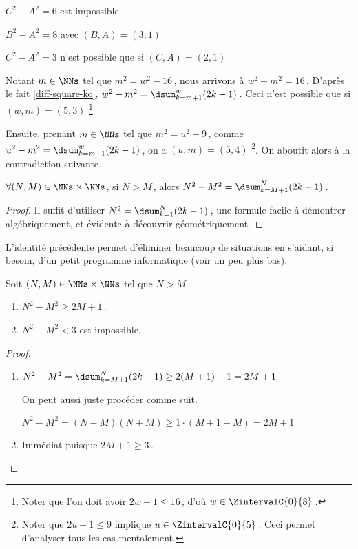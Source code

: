 $C^2 - A^2 = 6$ est impossible.


$B^2 - A^2 = 8$ avec $(B, A) = (3, 1)$


$C^2 - A^2 = 3$    n'est possible que si $(C, A) = (2, 1)$


Notant $m \in \NNs$ tel que $m^2 = w^2 - 16$\,, nous arrivons à $w^2 - m^2 = 16$\,.
		D'après le fait \ref{diff-square-ko}, $w^2 - m^2 = \dsum_{k=m+1}^{w} (2 k - 1)$\,.
		Ceci n'est possible que si $(w, m) = (5, 3)$
		\footnote{
			Noter que l'on doit avoir $2 w - 1 \leq 16$\,, d'où $w \in \ZintervalC{0}{8}$\,.
		}.
		
		
		
Ensuite, prenant $m \in \NNs$ tel que $m^2 = u^2 - 9$\,, comme $u^2 - m^2 = \dsum_{k=m+1}^{w} (2 k - 1)$\,, on a $(u, m) = (5, 4)$
		\footnote{
			Noter que $2 u - 1 \leq 9$ implique $u \in \ZintervalC{0}{5}$\,. Ceci permet d'analyser tous les cas mentalement.
		}.
		On aboutit alors à la contradiction suivante.
		
\begin{fact} \label{dist-square}
	$\forall (N, M) \in \NNs \times \NNs$, 
	si $N > M$\,, alors $N^2 - M^2 = \dsum_{k=M+1}^{N} (2 k - 1)$\,.
\end{fact}


\begin{proof}
	Il suffit d'utiliser $N^2 = \dsum_{k=1}^{N} (2 k - 1)$\,, une formule facile à démontrer algébriquement, et évidente à découvrir géométriquement.
\end{proof}




L'identité précédente permet d'éliminer beaucoup de situations en s'aidant, si besoin, d'un petit programme informatique (voir un peu plus bas).

\begin{fact} \label{diff-square-ko}
	Soit $(N, M) \in \NNs \times \NNs$ tel que $N > M$\,.
	\begin{enumerate}
		\item $N^2 - M^2 \geq 2M + 1$\,.
		
		\item $N^2 - M^2 < 3$ est impossible.
	\end{enumerate}
\end{fact}


\begin{proof}
	\leavevmode
	
	\begin{enumerate}
		\item $N^2 - M^2 = \dsum_{k=M+1}^{N} (2 k - 1) \geq 2(M + 1) - 1 = 2M + 1$
		
		\smallskip
		\noindent
		On peut aussi juste procéder comme suit. 
		
		\smallskip
		\noindent
		$N^2 - M^2 = (N - M)(N + M) \geq 1 \cdot (M + 1 + M) = 2M + 1$



		\item Immédiat puisque $2M + 1 \geq 3$\,.
	\end{enumerate}

\end{proof}


